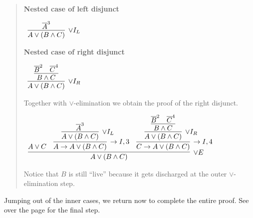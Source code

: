 \documentclass[11pt]{report}
\newcommand{\temp}[2]{{\overline{#2}}^{#1}}
\begin{document}
\begin{enumerate}
\begin{enumerate}
		\begin{quote}
			\textbf{Nested case of left disjunct}
				\begin{center}
					$\begin{array}{c}
						\infer[\lor I_{L}]{A \lor (B \land C)}
							{\temp{3}{A}}
					\end{array}$
				\end{center}

			\textbf{Nested case of right disjunct}

			\begin{center}
				$\begin{array}{c}
					\infer[\lor I_{R}]{A \lor (B \land C)}
						{\infer[]{B \land C}
							{\temp{2}{B}&\temp{4}{C}}}
				\end{array}$
			\end{center}

			Together with $\lor$-elimination we obtain the proof of the right disjunct.

			\begin{small}
				\begin{center}
					$\begin{array}{c}
						\infer[\lor E]{A \lor (B \land C)}
							{A \lor C
							&
							\infer[\to I,3]{A \to A \lor (B \land C)}
								{\infer[\lor I_{L}]{A \lor (B \land C)}
									{\temp{3}{A}}}
							&
							\infer[\to I, 4]{C \to A \lor (B \land C)}
								{\infer[\lor I_{R}]{A \lor (B \land C)}
									{\infer[]{B \land C}
										{\temp{2}{B}&\temp{4}{C}}}}}
					\end{array}$
				\end{center}
			\end{small}

			Notice that $B$ is still ``live'' because it gets discharged at the outer $\lor$-elimination step. 
		\end{quote}

		Jumping out of the inner cases, we return now to complete the entire proof. See over the page for the final step. 


\end{enumerate}
\end{enumerate}
\end{document}
